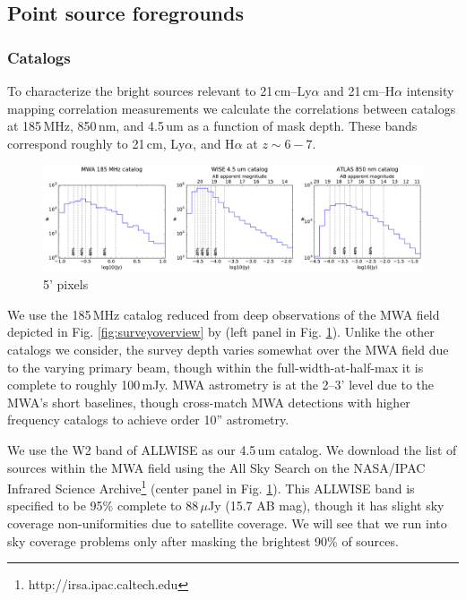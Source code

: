 \documentclass[preprint]{aastex}
\begin{document}
\subsection{Point source foregrounds}

\subsubsection{Catalogs}

To characterize the bright sources relevant to 21\,cm--Ly$\alpha$ and  21\,cm--H$\alpha$ intensity mapping correlation measurements we calculate the correlations between catalogs at 185\,MHz, 850\,nm, and 4.5\,um as a function of mask depth. These bands correspond roughly to 21\,cm, Ly$\alpha$, and H$\alpha$ at $z\sim6-7$. 

\begin{figure}[h]
\centering
\includegraphics[width=6.5in]{images/catalog_histograms.pdf}
\caption{5' pixels}
\label{fig:cataloghistograms}
\end{figure}

We use the 185\,MHz catalog reduced from deep observations of the MWA field depicted in Fig. \ref{fig:surveyoverview} by \citep{PattiCatalog1} (left panel in Fig. \ref{fig:cataloghistograms}). Unlike the other catalogs we consider, the survey depth varies somewhat over the MWA field due to the varying primary beam, though within the full-width-at-half-max it is complete to roughly 100\,mJy. MWA astrometry is at the 2--3' level due to the MWA's short baselines, though \citep{PattiCatalog1} cross-match MWA detections with higher frequency catalogs to achieve order 10'' astrometry. 

We use the W2 band of ALLWISE \citep{Wright2010,allwise} as our 4.5\,um catalog. We download the list of sources within the MWA field using the All Sky Search on the NASA/IPAC Infrared Science Archive\footnote{http://irsa.ipac.caltech.edu} (center panel in Fig. \ref{fig:cataloghistograms}). This ALLWISE band is specified to be 95\% complete to 88\,$\mu$Jy (15.7 AB mag), though it has slight sky coverage non-uniformities due to satellite coverage. We will see that we run into sky coverage problems only after masking the brightest 90\% of sources.
\end{document}
